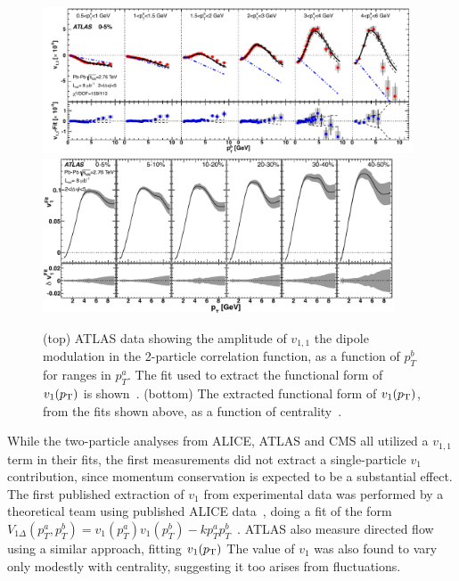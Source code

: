\begin{figure}[!tb]
\begin{center}
\includegraphics[width=0.98\textwidth]{flowcorrelations_figs/atlas_vn_fig_20a.pdf}
\includegraphics[width=0.93\textwidth]{flowcorrelations_figs/atlas_vn_fig_21.pdf}
\caption[]{ (top) ATLAS data showing the amplitude of $v_{1,1}$ the
  dipole modulation in the 2-particle correlation function, as a
  function of $p^b_T$ for ranges in $p^a_T$.  The fit used to extract
  the functional form of $v_1(\mbox{$p_{\mathrm{T}}$})$ is shown~\cite{ATLAS:2012at}.
  (bottom) The extracted functional form of $v_1(\mbox{$p_{\mathrm{T}}$})$, from the fits
  shown above, as a function of centrality~\cite{ATLAS:2012at}.  }
\label{fig:pas:fc:v1}
\end{center}
\end{figure}

While the two-particle analyses from ALICE, ATLAS and CMS all utilized a $v_{1,1}$ term in their fits, the first measurements
did not extract a single-particle $v_1$ contribution, since momentum conservation is expected to be a substantial effect.
The first published extraction of $v_1$ from experimental data was performed by a theoretical team using published ALICE data~\cite{Retinskaya:2012ky},
doing a fit of the form
$V_{1\Delta}(p^a_T,p^b_T) = v_1(p^a_T)v_1(p^b_T) - k p^a_T p^b_T$~\cite{Borghini:2000cm}.
ATLAS also measure directed flow using a similar approach,
fitting $v_1(\mbox{$p_{\mathrm{T}}$})$
The value of $v_1$ was also found to vary only modestly with centrality, suggesting it too arises from fluctuations.

